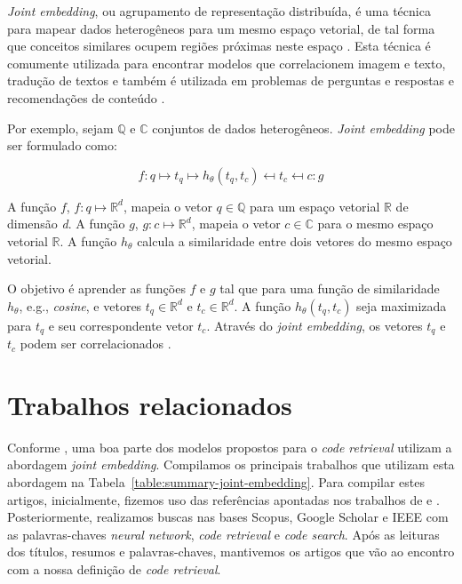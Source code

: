 \textit{Joint embedding}, ou agrupamento de representação distribuída, é uma técnica para mapear dados heterogêneos para um mesmo espaço vetorial, de tal forma que conceitos similares ocupem regiões próximas neste espaço \citep{Gu-deep-code-search:2018}. Esta técnica é comumente utilizada para encontrar modelos que correlacionem imagem e texto, tradução de textos e também é utilizada em problemas de perguntas e respostas e recomendações de conteúdo \citep{lai-etal-2018-review, Zhang:2019:deep-learning-recommender-survey}.

Por exemplo, sejam $\mathbb{Q}$ e $\mathbb{C}$ conjuntos de dados heterogêneos. \textit{Joint embedding} pode ser formulado como:

\begin{equation}
        f: q \mapsto t_{q} \mapsto h_{\theta}(t_{q}, t_{c}) \mapsfrom t_{c} \mapsfrom c :g
\end{equation}

A função $f$, $f: q \mapsto \mathbb{R}^{d}$, mapeia o vetor  $q \in \mathbb{Q}$ para um espaço vetorial $\mathbb{R}$ de dimensão \emph{d}. A função $g$, $g: c \mapsto \mathbb{R}^{d}$, mapeia o vetor $c \in \mathbb{C}$ para o mesmo espaço vetorial $\mathbb{R}$. A função $h_{\theta}$ calcula a similaridade entre dois vetores do mesmo espaço vetorial.


O objetivo é aprender as funções $f$ e $g$ tal que para uma função de similaridade $h_{\theta}$, e.g., \textit{cosine}, e vetores $t_{q} \in \mathbb{R}^{d}$ e $t_{c} \in \mathbb{R}^{d}$. A função  $h_{\theta}(t_{q}, t_{c})$ seja maximizada para $t_{q}$ e seu correspondente vetor $t_{c}$.
Através do \textit{joint embedding}, os vetores $t_{q}$ e $t_{c}$ podem ser correlacionados \citep{Gu-deep-code-search:2018, cambronero-deep-learning-code-search:2019}.

    

\section{Trabalhos relacionados}\label{sec:code-retrieval-trabalhos-relacionados}

Conforme \cite{cambronero-deep-learning-code-search:2019}, uma boa parte dos modelos propostos para o \textit{code retrieval} utilizam a abordagem \textit{joint embedding}. Compilamos os principais trabalhos que utilizam esta abordagem na Tabela~\ref{table:summary-joint-embedding}. Para compilar estes artigos, inicialmente, fizemos uso das referências apontadas nos  trabalhos de \citeauthor{Allamanis:2018:SML} e \citeauthor{yao-2018}. Posteriormente, realizamos buscas nas bases Scopus, Google Scholar e IEEE com as palavras-chaves \textit{neural network}, \textit{code retrieval} e \textit{code search}. Após as leituras dos títulos, resumos e palavras-chaves, mantivemos os artigos que vão ao encontro com a nossa definição de \textit{code retrieval}.

